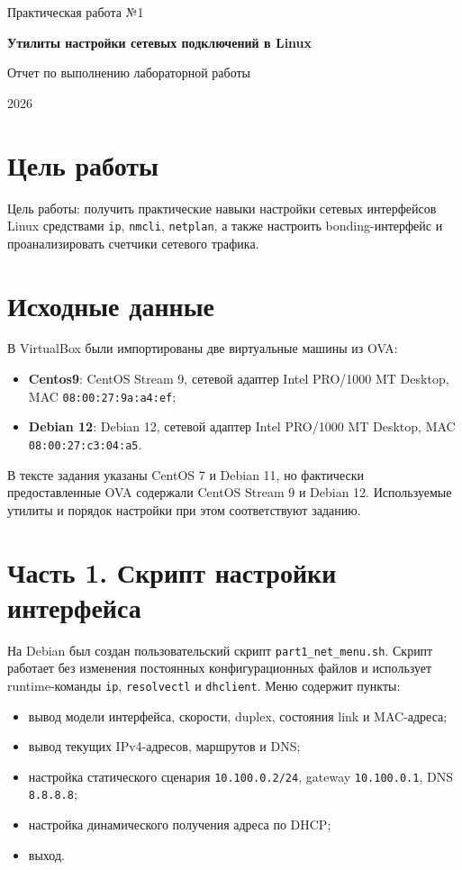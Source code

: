\documentclass[a4paper,12pt]{article}
\begin{document}
\begin{titlepage}
\centering
\vspace*{35mm}
{\Large Практическая работа №1\par}
\vspace{6mm}
{\LARGE\bfseries Утилиты настройки сетевых подключений в Linux\par}
\vspace{20mm}
{\large Отчет по выполнению лабораторной работы\par}
\vfill
{\large 2026\par}
\end{titlepage}

\tableofcontents
\newpage

\section{Цель работы}

Цель работы: получить практические навыки настройки сетевых интерфейсов Linux средствами \texttt{ip}, \texttt{nmcli}, \texttt{netplan}, а также настроить bonding-интерфейс и проанализировать счетчики сетевого трафика.

\section{Исходные данные}

В VirtualBox были импортированы две виртуальные машины из OVA:
\begin{itemize}
  \item \textbf{Centos9}: CentOS Stream 9, сетевой адаптер Intel PRO/1000 MT Desktop, MAC \texttt{08:00:27:9a:a4:ef};
  \item \textbf{Debian 12}: Debian 12, сетевой адаптер Intel PRO/1000 MT Desktop, MAC \texttt{08:00:27:c3:04:a5}.
\end{itemize}

В тексте задания указаны CentOS 7 и Debian 11, но фактически предоставленные OVA содержали CentOS Stream 9 и Debian 12. Используемые утилиты и порядок настройки при этом соответствуют заданию.

\section{Часть 1. Скрипт настройки интерфейса}

На Debian был создан пользовательский скрипт \texttt{part1\_net\_menu.sh}. Скрипт работает без изменения постоянных конфигурационных файлов и использует runtime-команды \texttt{ip}, \texttt{resolvectl} и \texttt{dhclient}. Меню содержит пункты:
\begin{itemize}
  \item вывод модели интерфейса, скорости, duplex, состояния link и MAC-адреса;
  \item вывод текущих IPv4-адресов, маршрутов и DNS;
  \item настройка статического сценария \texttt{10.100.0.2/24}, gateway \texttt{10.100.0.1}, DNS \texttt{8.8.8.8};
  \item настройка динамического получения адреса по DHCP;
  \item выход.
\end{itemize}
\end{document}
